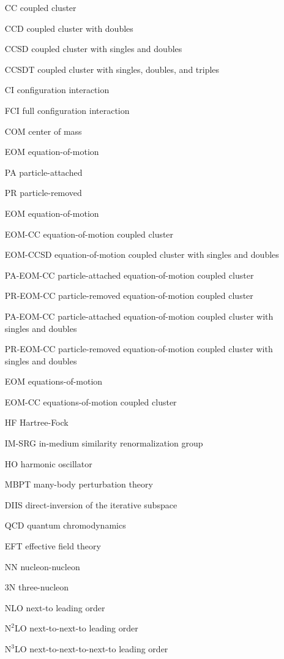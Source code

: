 \documentclass[thesis.tex]{subfiles}
\begin{document}
\begin{itemize}
\item[CC] coupled cluster
\item[CCD] coupled cluster with doubles
\item[CCSD] coupled cluster with singles and doubles
\item[CCSDT] coupled cluster with singles, doubles, and triples
\item[CI] configuration interaction
\item[FCI] full configuration interaction
\item[COM] center of mass
\item[EOM] equation-of-motion
\item[PA] particle-attached
\item[PR] particle-removed
\item[EOM] equation-of-motion
\item[EOM-CC] equation-of-motion coupled cluster
\item[EOM-CCSD] equation-of-motion coupled cluster with singles and doubles
\item[PA-EOM-CC] particle-attached equation-of-motion coupled cluster
\item[PR-EOM-CC] particle-removed equation-of-motion coupled cluster
\item[PA-EOM-CC] particle-attached equation-of-motion coupled cluster with singles and doubles
\item[PR-EOM-CC] particle-removed equation-of-motion coupled cluster with singles and doubles
\item[EOM] equations-of-motion
\item[EOM-CC] equations-of-motion coupled cluster
\item[HF] Hartree-Fock
\item[IM-SRG] in-medium similarity renormalization group
\item[HO] harmonic oscillator
\item[MBPT] many-body perturbation theory
\item[DIIS] direct-inversion of the iterative subspace
\item[QCD] quantum chromodynamics
\item[EFT] effective field theory
\item[NN] nucleon-nucleon
\item[3N] three-nucleon
\item[NLO] next-to leading order
\item[$\text{N}^{2}$LO] next-to-next-to leading order
\item[$\text{N}^{3}$LO] next-to-next-to-next-to leading order
\end{itemize}
\end{document}
